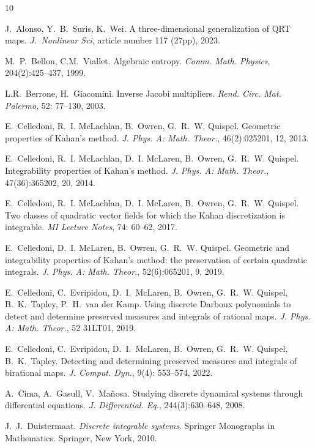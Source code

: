 \documentclass[11pt]{article}
\begin{document}
\begin{thebibliography}{10}

 J.~Alonso, Y.~B.~Suris, K.~Wei. A three-dimensional generalization of QRT maps. {\em J.~Nonlinear Sci}, article number 117 (27pp), 2023.

 M.~P.~Bellon, C.M.~Viallet. Algebraic entropy. {\em Comm. Math. Physics}, 204(2):425--437, 1999.

L.R.~Berrone, H.~Giacomini. Inverse Jacobi multipliers.
{\em Rend. Circ. Mat. Palermo}, 52: 77--130, 2003.

E.~Celledoni, R.~I. McLachlan, B.~Owren, G.~R.~W. Quispel.
 Geometric properties of {K}ahan's method.
 {\em J. Phys. A: Math. Theor.}, 46(2):025201, 12, 2013.

E.~Celledoni, R.~I. McLachlan, D.~I. McLaren, B.~Owren,  G.~R.~W. Quispel.
 Integrability properties of {K}ahan's method.
 {\em J. Phys. A: Math. Theor.}, 47(36):365202, 20, 2014.

 E.~Celledoni, R.~I. McLachlan, D.~I. McLaren, B.~Owren, G.~R.~W. Quispel. Two classes of quadratic vector fields for which the Kahan discretization is integrable. \emph{MI Lecture Notes}, 74: 60--62, 2017.

E.~Celledoni, D.~I. McLaren, B.~Owren, G.~R.~W. Quispel.
 Geometric and integrability properties of {K}ahan's method: the
  preservation of certain quadratic integrals.
 {\em J. Phys. A: Math. Theor.}, 52(6):065201, 9, 2019.


 E.~Celledoni,
C.~Evripidou, D.~I.~McLaren, B.~Owren, G.~R.~W. Quispel, B.~K.~Tapley, P.~H.~van der Kamp. Using discrete Darboux polynomials to detect and determine preserved measures and integrals of rational maps. {\em J. Phys. A: Math. Theor.}, 52 31LT01, 2019.

E.~Celledoni, C.~Evripidou, D.~I.~McLaren, B.~Owren, G.~R.~W. Quispel, B.~K.~Tapley. Detecting and determining preserved measures and integrals of birational maps. {\em J. Comput. Dyn.}, 9(4): 553--574, 2022.

A.~Cima, A.~Gasull, V.~Ma\~{n}osa.
 Studying discrete dynamical systems through differential equations.
 {\em J. Differential. Eq.}, 244(3):630--648, 2008.

J.~J.~Duistermaat.
{\em Discrete integrable systems}.
Springer Monographs in Mathematics. Springer, New York, 2010.



\end{thebibliography}
\end{document}
